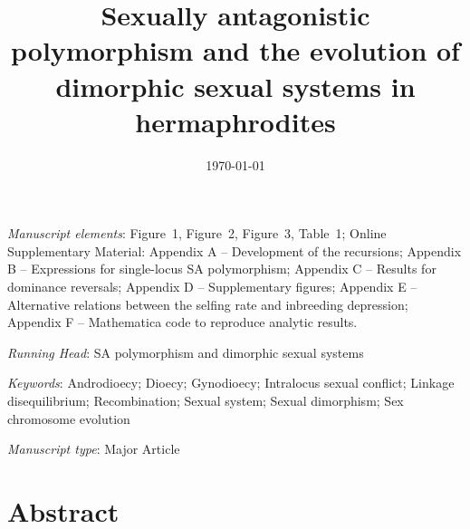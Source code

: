 \documentclass{article}
\title{Sexually antagonistic polymorphism and the evolution of dimorphic sexual systems in hermaphrodites}
\date{\today}
\begin{document}
\maketitle





\bigskip

\noindent{} \textit{Manuscript elements}: Figure~1, Figure~2, Figure~3, Table~1; Online Supplementary Material: Appendix A -- Development of the recursions; Appendix B -- Expressions for single-locus SA polymorphism; Appendix C -- Results for dominance reversals; Appendix D -- Supplementary figures; Appendix E -- Alternative relations between the selfing rate and inbreeding depression; Appendix F -- Mathematica code to reproduce analytic results.

\bigskip
\noindent{} \textit{Running Head}: SA polymorphism and dimorphic sexual systems

\bigskip

\noindent{} \textit{Keywords}: Androdioecy; Dioecy; Gynodioecy; Intralocus sexual conflict; Linkage disequilibrium; Recombination; Sexual system; Sexual dimorphism; Sex chromosome evolution

\bigskip

\noindent{} \textit{Manuscript type}: Major Article

\bigskip


\linenumbers
\modulolinenumbers[1]
\renewcommand\linenumberfont{\normalfont\small}


\newpage{}
\section*{Abstract}
\end{document}
